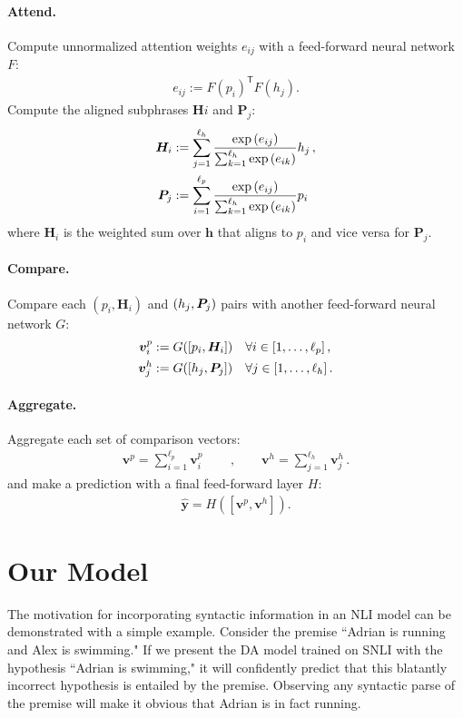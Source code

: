 \documentclass[11pt,a4paper]{article}
\begin{document}
\paragraph{Attend.} Compute unnormalized attention weights $e_{ij}$ with
a feed-forward neural network $F$:
\begin{align}\label{eq:attend}
    e_{ij} := F(p_i)^\mathsf{T} F(h_j).
\end{align}
Compute the aligned subphrases $\bm{H}i$ and $\bm{P}_j$:
\begin{align}
  \bm{H}_i &:= \sum_{j=1}^{\ell_h}\frac{\exp{(e_{ij})}}
      {\sum_{k=1}^{\ell_h}\exp{(e_{ik})}}h_j\,, \notag \\
  \bm{P}_j &:= \sum_{i=1}^{\ell_p}\frac{\exp{(e_{ij})}}
      {\sum_{k=1}^{\ell_h}\exp{(e_{ik})}}p_i\
\end{align}
where $\bm{H}_i$ is the weighted sum over $\bm{h}$ that aligns to $p_i$ and
vice versa for $\bm{P}_j$.

\paragraph{Compare.} Compare each $(p_i, \bm{H}_i)$ and $(h_j, \bm{P_}j)$ pairs
with another feed-forward neural network $G$:
\begin{align}
  \bm{v}^p_i &:= G([p_i, \bm{H}_i])\quad \forall i \in [1,\ldots, \ell_p]\,,
      \notag \\
  \bm{v}^h_j &:= G([h_j, \bm{P}_j])\quad \forall j \in [1,\ldots, \ell_h]\,.
\end{align}

\paragraph{Aggregate.} Aggregate each set of comparison vectors:
\begin{align}
\bm{v}^p = \sum_{i=1}^{\ell_p} \bm{v}^p_i \qquad\,, \qquad
\bm{v}^h = \sum_{j=1}^{\ell_h}  \bm{v}^h_j\,.
\end{align}
and make a prediction with a final feed-forward layer $H$:
\begin{align}\label{eq:predict}
    \hat{\bm{y}} = H([\bm{v}^p, \bm{v}^h]).
\end{align}

\section{Our Model}

The motivation for incorporating syntactic information in an NLI model can be
demonstrated with a simple example. Consider the premise ``Adrian is running
and Alex is swimming." If we present the DA model trained on SNLI with the
hypothesis ``Adrian is swimming," it will confidently predict that this
blatantly incorrect hypothesis is entailed by the premise. Observing any
syntactic parse of the premise will make it obvious that Adrian is in fact
running.
\end{document}

